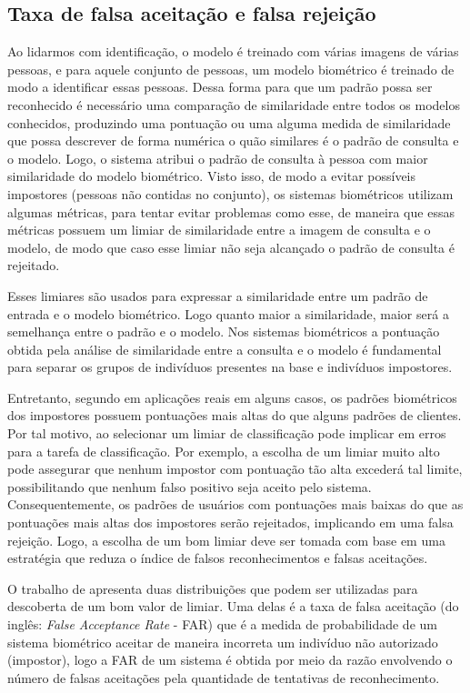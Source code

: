 \subsection{Taxa de falsa aceitação e falsa rejeição}
Ao lidarmos com identificação, o modelo é treinado com várias imagens de várias pessoas, e para aquele conjunto de pessoas, um modelo biométrico é treinado de modo a identificar essas pessoas. Dessa forma para que um padrão possa ser reconhecido é necessário uma comparação de similaridade entre todos os modelos conhecidos, produzindo uma pontuação ou uma alguma medida de similaridade que possa descrever de forma numérica o quão similares é o padrão de consulta e o modelo. Logo, o sistema atribui o padrão de consulta à pessoa com maior similaridade do modelo biométrico. Visto isso, de modo a evitar possíveis impostores (pessoas não contidas no conjunto), os sistemas biométricos utilizam algumas métricas, para tentar evitar problemas como esse, de maneira que essas métricas possuem um limiar de similaridade entre a imagem de consulta e o modelo, de modo que caso esse limiar não seja alcançado o padrão de consulta é rejeitado.

Esses limiares são usados para expressar a similaridade entre um padrão de entrada e o modelo biométrico. Logo quanto maior a similaridade, maior será a semelhança entre o padrão e o modelo. Nos sistemas biométricos a pontuação obtida pela análise de similaridade entre a consulta e o modelo é fundamental para separar os grupos de indivíduos presentes na base e indivíduos impostores.

Entretanto, segundo  em aplicações reais em alguns casos, os padrões biométricos dos impostores possuem pontuações mais altas do que alguns padrões de clientes. Por tal motivo, ao selecionar um limiar de classificação pode implicar em erros para a tarefa de classificação. Por exemplo, a escolha de um limiar muito alto pode assegurar que nenhum impostor com pontuação tão alta excederá tal limite, possibilitando que nenhum falso positivo seja aceito pelo sistema. Consequentemente, os padrões de usuários com pontuações mais baixas do que as pontuações mais altas dos impostores serão rejeitados, implicando em uma falsa rejeição. Logo, a escolha de um bom limiar deve ser tomada com base em uma estratégia que reduza o índice de falsos reconhecimentos e falsas aceitações.

O trabalho de  apresenta duas distribuições que podem ser utilizadas para descoberta de um bom valor de limiar. Uma delas é a taxa de falsa aceitação (do inglês: \textit{False Acceptance Rate} - FAR) que é a medida de probabilidade de um sistema biométrico aceitar de maneira incorreta um indivíduo não autorizado (impostor), logo a FAR de um sistema é obtida por meio da razão envolvendo o número de falsas aceitações pela quantidade de tentativas de reconhecimento. 

